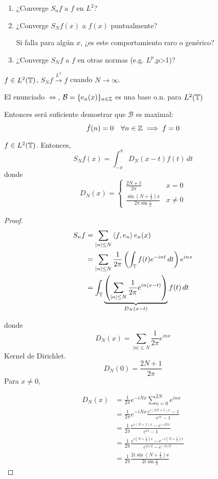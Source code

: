 \begin{enumerate}
    \item ¿Converge $S_n f$ a $f$ en $L^2$?
    \item ¿Converge $S_N f(x)$ a $f(x)$ puntualmente?
    
    Si falla para algún $x$, ¿es este comportamiento raro o genérico?

    \item ¿Converge $S_N f$ a $f$ en otras normas (e.g. $L^p$,p>1)?
\end{enumerate}

\begin{ftheorem}
    $f\in L^2(\mathbb{T})$, $S_N f\xrightarrow{L^2}f$ cuando $N\to\infty$.
\end{ftheorem}

\begin{fnote}
    El enunciado $\iff$,  $\mathcal{B}=\{e_n(x)\}_{n\in\mathbb{Z}}$ es una base o.n. para $L^2(\mathbb{T})$
\end{fnote}

    Entonces será suficiente demostrar que $\mathcal{B}$ es maximal:
    \[\hat f(n)=0\quad\forall n\in\mathbb{Z}\implies f=0\]


\begin{ftheorem}
    $f\in L^2(\mathbb{T})$. Entonces, 
    \[S_N f(x)=\int_{-\pi}^\pi D_N(x-t)f(t)\,dt\]
    donde 
    \[D_N(x)=\begin{cases}
        \frac{2N+1}{2\pi}& x=0\\
        \frac{\sin(N+\frac{1}{2})x}{2\pi\sin \frac{x}{2}}&x\neq 0
    \end{cases}\]
\end{ftheorem}

\begin{proof}
    \begin{align*}
        S_n f&=\sum_{|n|\leq N}\left\langle f,e_n\right\rangle e_n(x)\\
        &=\sum_{|n|\leq N} \frac{1}{2\pi}\left( \int_{\mathbb{T}} f(t)e^{-int}\,dt\right) e^{inx}\\
        &=\int_{\mathbb{T}} \underbrace{\left(\sum_{|n|\leq N} \frac{1}{2\pi} e^{in(x-t)}\right)}_{D_N(x-t)}f(t)\,dt
    \end{align*}

    donde 
    \[D_N(x)=\sum_{|n|\leq N} \frac{1}{2\pi} e^{inx}\]
    Kernel de Dirichlet.
    \[D_N(0)=\frac{2N+1}{2\pi}\]
    Para $x\neq 0$,

    \begin{align*}
        D_N(x)&=\frac{1}{2\pi} e^{-iNx} \sum_{n=0}^{2N} e^{inx}\\
        &=\frac{1}{2\pi} e^{-iNx} \frac{e^{i(2N+1)x}-1}{e^{ix}-1}\\
        &=\frac{1}{2\pi} \frac{e^{i(N+1)x}-e^{-iNx}}{e^{ix}-1}\\
        &=\frac{1}{2\pi}\frac{e^{i(N+\frac{1}{2})x}-e^{-i(N+\frac{1}{2})x}}{e^{ix/2}-e^{-ix/2}}\\
        &=\frac{1}{2\pi}\frac{2i \sin(N+\frac{1}{2})x}{2i \sin \frac{x}{2}}
    \end{align*}
\end{proof}

